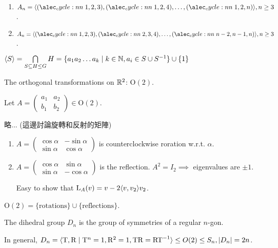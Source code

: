 \begin{exercise} \mbox{}
  \begin{enumerate}
    \item $A_n = \gen{\cycle{1,2,3},\cycle{1,2,4},\dots,\cycle{1,2,n}}, n \ge 3$.
    \item $A_n = \gen{\cycle{1,2,3},\cycle{2,3,4},\dots,\cycle{n-2,n-1,n}}, n \ge 3$.
  \end{enumerate}
\end{exercise}

\begin{remark}
  $\langle S\rangle = \bigcap\limits_{S \subseteq H \le G} H =
  \{ a_1a_2\dots a_k \mid k \in \mathbb{N}, a_i \in S \cup S^{-1}\} \cup \{1\}$
\end{remark}

The orthogonal transformations on $\mathbb{R}^2$: $\text{O}(2)$.

Let $A = \begin{pmatrix}a_1 & a_2 \\ b_1 & b_2\end{pmatrix} \in \text{O}(2)$.

略... (這邊討論旋轉和反射的矩陣)

\begin{enumerate}
  \item $A = \begin{pmatrix}
      \cos\alpha & -\sin\alpha \\
      \sin\alpha & \cos\alpha
    \end{pmatrix}$ is counterclockwise roration w.r.t. $\alpha$.
  \item $A = \begin{pmatrix}
      \cos\alpha & \sin\alpha \\
      \sin\alpha & -\cos\alpha
    \end{pmatrix}$ is the reflection.
    $A^2 = I_2 \implies$ eigenvalues are $\pm 1$.

    Easy to show that $\text{L}_A(v) = v - 2 \langle v, v_2\rangle v_2$.
\end{enumerate}

$\text{O}(2) = \{\text{rotations}\} \cup \{\text{reflections}\}$.

\begin{definition}
  The dihedral group $D_n$ is the group of symmetries of a regular $n$-gon.

  In general, $D_n = \langle {\rm T, R} \mid
  {\rm T}^n = 1, {\rm R}^2 = 1, {\rm TR} = {\rm RT}^{-1} \rangle \le O(2)
  \le S_n, \lvert D_n\rvert = 2n$.
\end{definition}


